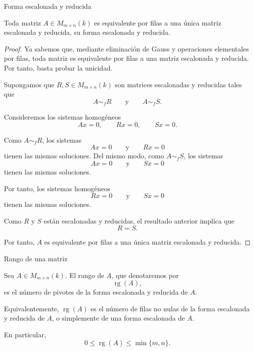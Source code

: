 \begin{frame}[allowframebreaks, t]{Forma escalonada y reducida}

\begin{theorem}
Toda matriz \(A\in M_{m\times n}(k)\) es equivalente por filas a una
única matriz escalonada y reducida, su \alert{forma escalonada y reducida}.
\end{theorem}

\begin{proof}
Ya sabemos que, mediante eliminación de Gauss y operaciones
elementales por filas, toda matriz es equivalente por filas a una
matriz escalonada y reducida. Por tanto, basta probar la unicidad.

\medskip

Supongamos que \(R,S\in M_{m\times n}(k)\) son matrices escalonadas
y reducidas tales que
\[
A\sim_f R
\qquad\text{y}\qquad
A\sim_f S.
\]

Consideremos los sistemas homogéneos
\[
Ax=0,\qquad Rx=0,\qquad Sx=0.
\]

Como \(A\sim_f R\), los sistemas
\[
Ax=0
\qquad\text{y}\qquad
Rx=0
\]
tienen las mismas soluciones. Del mismo modo, como \(A\sim_f S\),
los sistemas
\[
Ax=0
\qquad\text{y}\qquad
Sx=0
\]
tienen las mismas soluciones.

\medskip

Por tanto, los sistemas homogéneos
\[
Rx=0
\qquad\text{y}\qquad
Sx=0
\]
tienen las mismas soluciones.

\medskip

Como \(R\) y \(S\) están escalonadas y reducidas, el resultado
anterior implica que
\[
R=S.
\]

Por tanto, \(A\) es equivalente por filas a una única matriz
escalonada y reducida.
\end{proof}

\end{frame}

\begin{frame}{Rango de una matriz}

\begin{definition}
Sea \(A\in M_{m\times n}(k)\). El \alert{rango} de \(A\), que
denotaremos por
\[
\operatorname{rg}(A),
\]
es el número de pivotes de la forma escalonada y reducida de \(A\).
\end{definition}

\medskip

Equivalentemente, \(\operatorname{rg}(A)\) es el número de filas
no nulas de la forma escalonada y reducida de \(A\), o simplemente de una forma escalonada de $A$.

\medskip

En particular,
\[
0\leq \operatorname{rg}(A)\leq \min\{m,n\}.
\]

\end{frame}

